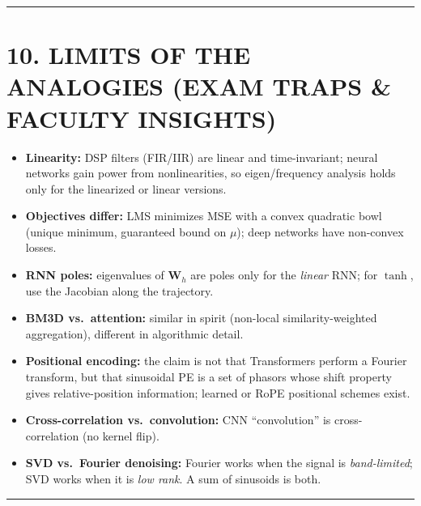 \documentclass[11pt,a4paper]{article}
\begin{document}
\noindent\rule{\textwidth}{0.5pt}

\section{10. LIMITS OF THE ANALOGIES (EXAM TRAPS \& FACULTY INSIGHTS)}
\begin{itemize}
    \item \textbf{Linearity:} DSP filters (FIR/IIR) are linear and time-invariant; neural networks gain power from nonlinearities, so eigen/frequency analysis holds only for the linearized or linear versions.
    \item \textbf{Objectives differ:} LMS minimizes MSE with a convex quadratic bowl (unique minimum, guaranteed bound on $\mu$); deep networks have non-convex losses.
    \item \textbf{RNN poles:} eigenvalues of $\mathbf{W}_h$ are poles only for the \emph{linear} RNN; for $\tanh$, use the Jacobian along the trajectory.
    \item \textbf{BM3D vs.\ attention:} similar in spirit (non-local similarity-weighted aggregation), different in algorithmic detail.
    \item \textbf{Positional encoding:} the claim is not that Transformers perform a Fourier transform, but that sinusoidal PE is a set of phasors whose shift property gives relative-position information; learned or RoPE positional schemes exist.
    \item \textbf{Cross-correlation vs.\ convolution:} CNN ``convolution'' is cross-correlation (no kernel flip).
    \item \textbf{SVD vs.\ Fourier denoising:} Fourier works when the signal is \emph{band-limited}; SVD works when it is \emph{low rank}. A sum of sinusoids is both.
\end{itemize}

\noindent\rule{\textwidth}{0.5pt}
\end{document}
